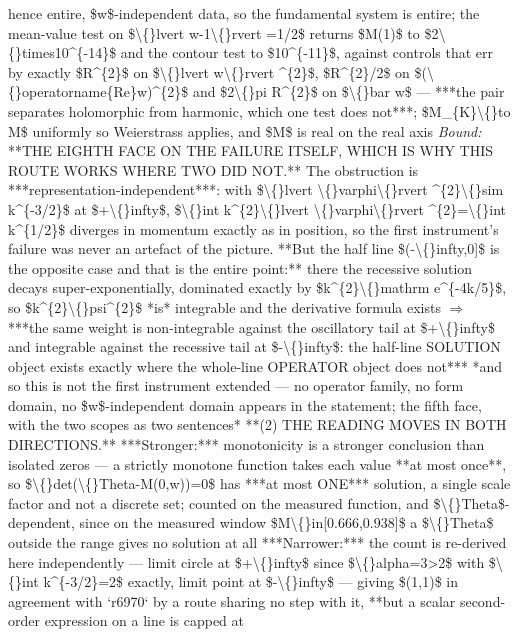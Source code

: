 \begin{description}
hence entire, \$w\$-independent data, so the fundamental system is entire; the mean-value test on \$\textbackslash\{\}lvert w-1\textbackslash\{\}rvert =1/2\$ returns \$M(1)\$ to \$2\textbackslash\{\}times10\textasciicircum{}\{-14\}\$ and the contour test to \$10\textasciicircum{}\{-11\}\$, against controls that err by exactly \$R\textasciicircum{}\{2\}\$ on \$\textbackslash\{\}lvert w\textbackslash\{\}rvert \textasciicircum{}\{2\}\$, \$R\textasciicircum{}\{2\}/2\$ on \$(\textbackslash\{\}operatorname\{Re\}w)\textasciicircum{}\{2\}\$ and \$2\textbackslash\{\}pi R\textasciicircum{}\{2\}\$ on \$\textbackslash\{\}bar w\$ --- ***the pair separates holomorphic from harmonic, which one test does not***; \$M\_\{K\}\textbackslash\{\}to M\$ uniformly so Weierstrass applies, and \$M\$ is real on the real axis
 \emph{Bound:}  **THE EIGHTH FACE ON THE FAILURE ITSELF, WHICH IS WHY THIS ROUTE WORKS WHERE TWO DID NOT.** The obstruction is ***representation-independent***: with \$\textbackslash\{\}lvert \textbackslash\{\}varphi\textbackslash\{\}rvert \textasciicircum{}\{2\}\textbackslash\{\}sim k\textasciicircum{}\{-3/2\}\$ at \$+\textbackslash\{\}infty\$, \$\textbackslash\{\}int k\textasciicircum{}\{2\}\textbackslash\{\}lvert \textbackslash\{\}varphi\textbackslash\{\}rvert \textasciicircum{}\{2\}=\textbackslash\{\}int k\textasciicircum{}\{1/2\}\$ diverges in momentum exactly as in position, so the first instrument's failure was never an artefact of the picture. **But the half line \$(-\textbackslash\{\}infty,0]\$ is the opposite case and that is the entire point:** there the recessive solution decays super-exponentially, dominated exactly by \$k\textasciicircum{}\{2\}\textbackslash\{\}mathrm e\textasciicircum{}\{-4k/5\}\$, so \$k\textasciicircum{}\{2\}\textbackslash\{\}psi\textasciicircum{}\{2\}\$ *is* integrable and the derivative formula exists \ensuremath{\Rightarrow} ***the same weight is non-integrable against the oscillatory tail at \$+\textbackslash\{\}infty\$ and integrable against the recessive tail at \$-\textbackslash\{\}infty\$: the half-line SOLUTION object exists exactly where the whole-line OPERATOR object does not***  *and so this is not the first instrument extended --- no operator family, no form domain, no \$w\$-independent domain appears in the statement; the fifth face, with the two scopes as two sentences*  **(2) THE READING MOVES IN BOTH DIRECTIONS.** ***Stronger:*** monotonicity is a stronger conclusion than isolated zeros --- a strictly monotone function takes each value **at most once**, so \$\textbackslash\{\}det(\textbackslash\{\}Theta-M(0,w))=0\$ has ***at most ONE*** solution, a single scale factor and not a discrete set; counted on the measured function, and \$\textbackslash\{\}Theta\$-dependent, since on the measured window \$M\textbackslash\{\}in[0.666,0.938]\$ a \$\textbackslash\{\}Theta\$ outside the range gives no solution at all  ***Narrower:*** the count is re-derived here independently --- limit circle at \$+\textbackslash\{\}infty\$ since \$\textbackslash\{\}alpha=3>2\$ with \$\textbackslash\{\}int k\textasciicircum{}\{-3/2\}=2\$ exactly, limit point at \$-\textbackslash\{\}infty\$ --- giving \$(1,1)\$ in agreement with `r6970` by a route sharing no step with it, **but a scalar second-order expression on a line is capped at 
\end{description}
